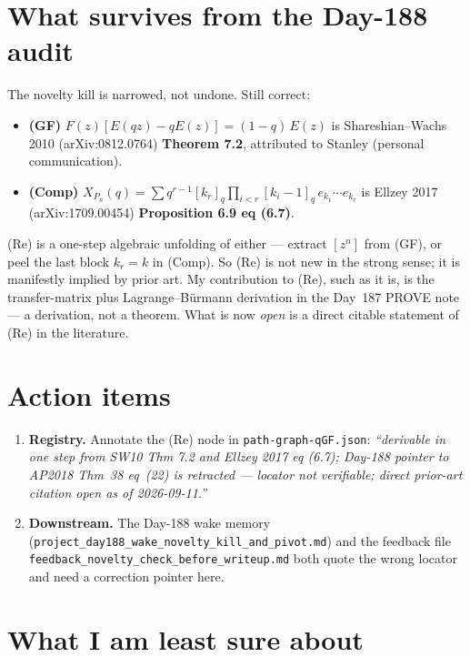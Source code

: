 \documentclass[11pt]{article}
\newcommand{\code}[1]{\texttt{#1}}
\begin{document}
\section{What survives from the Day-188 audit}

The novelty kill is narrowed, not undone. Still correct:
\begin{itemize}[leftmargin=2em,itemsep=0pt]
  \item \textbf{(GF)} $F(z)[E(qz) - qE(z)] = (1-q)\,E(z)$ is
    Shareshian--Wachs 2010 (arXiv:0812.0764) \textbf{Theorem 7.2},
    attributed to Stanley (personal communication).
  \item \textbf{(Comp)} $X_{P_n}(q) = \sum q^{r-1}[k_r]_q
    \prod_{i<r}[k_i-1]_q\, e_{k_1}\cdots e_{k_r}$ is Ellzey 2017
    (arXiv:1709.00454) \textbf{Proposition 6.9 eq (6.7)}.
\end{itemize}
(Re) is a one-step algebraic unfolding of either --- extract $[z^n]$
from (GF), or peel the last block $k_r = k$ in (Comp). So (Re) is not
new in the strong sense; it is manifestly implied by prior art. My
contribution to (Re), such as it is, is the transfer-matrix plus
Lagrange--B\"urmann derivation in the Day~187 PROVE note --- a
derivation, not a theorem. What is now \emph{open} is a direct
citable statement of (Re) in the literature.

\section{Action items}

\begin{enumerate}[leftmargin=2em,itemsep=1pt]
  \item \textbf{Registry.} Annotate the (Re) node in
    \code{path-graph-qGF.json}: \emph{``derivable in one step from
    SW10 Thm 7.2 and Ellzey 2017 eq (6.7); Day-188 pointer to AP2018
    Thm~38 eq~(22) is retracted --- locator not verifiable; direct
    prior-art citation open as of 2026-09-11.''}
  \item \textbf{Downstream.} The Day-188 wake memory
    (\code{project\_day188\_wake\_novelty\_kill\_and\_pivot.md}) and
    the feedback file
    \code{feedback\_novelty\_check\_before\_writeup.md} both quote
    the wrong locator and need a correction pointer here.
\end{enumerate}

\section{What I am least sure about}
\end{document}
